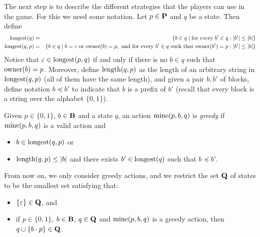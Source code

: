 The next step is to describe the different strategies that the players can use in the game. For this we need some notation. Let $p \in \mathbf{P}$ and $q$ be a state. Then define
\begin{eqnarray*}
{\text{\rm longest}}(q) & = & \{ b \in q \mid \text{for every } b' \in q: |b'| \leq |b|\}\\
{\text{\rm longest}}(q,p) & = & \{ b \in q \mid b = \varepsilon \text{ or } \text{\rm owner}(b) = p, \text{ and for every } b' \in q \text{ such that } \text{\rm owner}(b') = p : |b'| \leq |b|\}
\end{eqnarray*}
Notice that $\varepsilon \in {\text{\rm longest}}(p,q)$ if and only if there is no $b \in q$ such that $\text{\rm owner}(b) = p$. Moreover, define $\text{\rm length}(q,p)$ as the length of an arbitrary string in ${\text{\rm longest}}(q,p)$ (all of them have the same length), and given a pair $b, b' $ of blocks, define notation $b \preceq b'$ to indicate that $b$ is a prefix of $b'$ (recall that every block is a string over the alphabet $\{0, 1\}$). 

\begin{mydef}\label{def-greedy}
Given $p \in \{0,1\}$, $b \in \mathbf{B}$ and a state $q$, an action $\text{\rm mine}(p,b,q)$ is {\em greedy} if $\text{\rm mine}(p,b,q)$ is a valid action and
\begin{itemize}
\item $b \in {\text{\rm longest}}(q,p)$ or

\item $\text{\rm length}(q,p) \leq |b|$ and there exists $b' \in {\text{\rm longest}}(q)$ such that $b \preceq b'$.
\end{itemize}
\end{mydef}
From now on, we only consider greedy actions, and we restrict the set $\mathbf{Q}$ of states to be the smallest set satisfying that:
\begin{itemize}
\item $\{\varepsilon\} \in \mathbf{Q}$, and

\item if $p \in \{0,1\}$, $b \in \mathbf{B}$, $q \in \mathbf{Q}$ and $\text{\rm mine}(p,b,q)$ is a greedy action, then $q \cup \{ b \cdot p\} \in \mathbf{Q}$.
\end{itemize}
 

